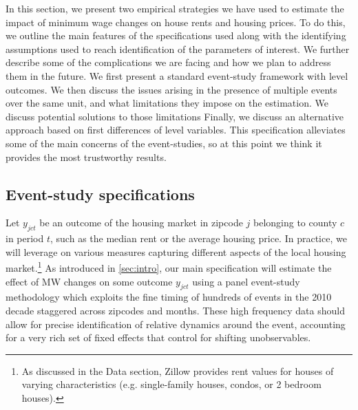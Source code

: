 
In this section, we present two empirical strategies we have used to estimate the impact of minimum wage changes on house rents and housing prices. To do this, we outline the main features of the specifications used along with the identifying assumptions used to reach identification of the parameters of interest. We further describe some of the complications we are facing and how we plan to address them in the future. We first present a standard event-study framework with level outcomes. We then discuss the issues arising in the presence of multiple events over the same unit, and what limitations they impose on the estimation. We discuss potential solutions to those limitations Finally, we discuss an alternative approach based on first differences of level variables. This specification  alleviates some of the main concerns of the event-studies, so at this point we think it provides the most trustworthy results.

\subsection{Event-study specifications} \label{subsec:empirical_strategy/event-study}

    Let $y_{jct}$ be an outcome of the housing market in zipcode $j$ belonging to county $c$ in period $t$, such as the median rent or the average housing price. In practice, we will leverage on various measures capturing different aspects of the local housing market.\footnote{As discussed in the Data section, Zillow provides rent values for houses of varying characteristics (e.g. single-family houses, condos, or 2 bedroom houses).} As introduced in \autoref{sec:intro}, our main specification will estimate the effect of MW changes on some outcome $y_{jct}$ using a panel event-study methodology which exploits the fine timing of hundreds of events in the 2010 decade staggered across zipcodes and months. These high frequency data should allow for precise identification of relative dynamics around the event, accounting for a very rich set of fixed effects that control for shifting unobservables.
    
